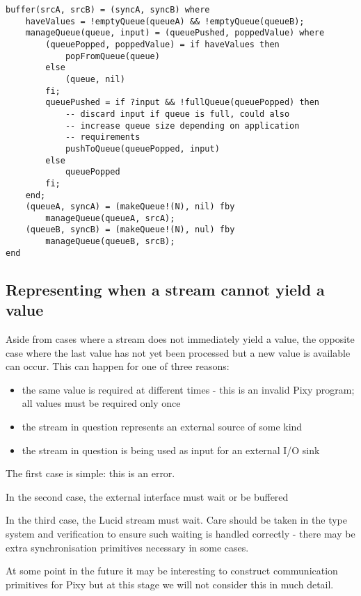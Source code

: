 \documentclass{scrartcl}
\begin{document}
    \begin{lstlisting}
buffer(srcA, srcB) = (syncA, syncB) where
    haveValues = !emptyQueue(queueA) && !emptyQueue(queueB);
    manageQueue(queue, input) = (queuePushed, poppedValue) where
        (queuePopped, poppedValue) = if haveValues then
            popFromQueue(queue)
        else
            (queue, nil)
        fi;
        queuePushed = if ?input && !fullQueue(queuePopped) then
            -- discard input if queue is full, could also
            -- increase queue size depending on application
            -- requirements
            pushToQueue(queuePopped, input)
        else
            queuePopped
        fi;
    end;
    (queueA, syncA) = (makeQueue!(N), nil) fby
        manageQueue(queueA, srcA);
    (queueB, syncB) = (makeQueue!(N), nul) fby
        manageQueue(queueB, srcB);
end
    \end{lstlisting}
        
    \subsection{Representing when a stream cannot yield a value}
    
    Aside from cases where a stream does not immediately yield a value, the opposite case where the last value has not yet been processed but a new value is available can occur. This can happen for one of three reasons:
    \begin{itemize}
        \item the same value is required at different times - this is an invalid Pixy program; all values must be required only once
        \item the stream in question represents an external source of some kind
        \item the stream in question is being used as input for an external I/O sink
    \end{itemize}
    
    The first case is simple: this is an error.
    
    In the second case, the external interface must wait or be buffered
    
    In the third case, the Lucid stream must wait. Care should be taken in the type system and verification to ensure such waiting is handled correctly - there may be extra synchronisation primitives necessary in some cases.
    
    At some point in the future it may be interesting to construct communication primitives for Pixy but at this stage we will not consider this in much detail.
\end{document}
